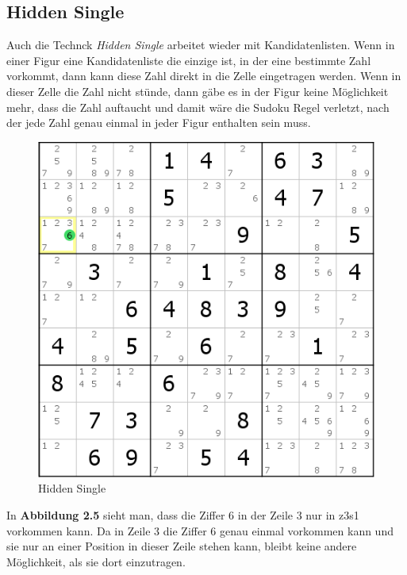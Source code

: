 \newpage
\subsection{Hidden Single}
\label{Hidden Single}
Auch die Technck \textit{Hidden Single} arbeitet wieder mit Kandidatenlisten. Wenn in einer Figur eine Kandidatenliste die einzige ist, in der eine bestimmte Zahl vorkommt, dann kann diese Zahl direkt in die Zelle eingetragen werden. Wenn in dieser Zelle die Zahl nicht stünde, dann gäbe es in der Figur keine Möglichkeit mehr, dass die Zahl auftaucht und damit wäre die Sudoku Regel verletzt, nach der jede Zahl genau einmal in jeder Figur enthalten sein muss.

\begin{figure}[h]
\begin{center}
\includegraphics{./img/hidden_single.png}
\caption{Hidden Single}
\end{center}
\end{figure}

\noindent In \textbf{Abbildung 2.5} sieht man, dass die Ziffer 6 in der Zeile 3 nur in z3s1 vorkommen kann. Da in Zeile 3 die Ziffer 6 genau einmal vorkommen kann und sie nur an einer Position in dieser Zeile stehen kann, bleibt keine andere Möglichkeit, als sie dort einzutragen.
